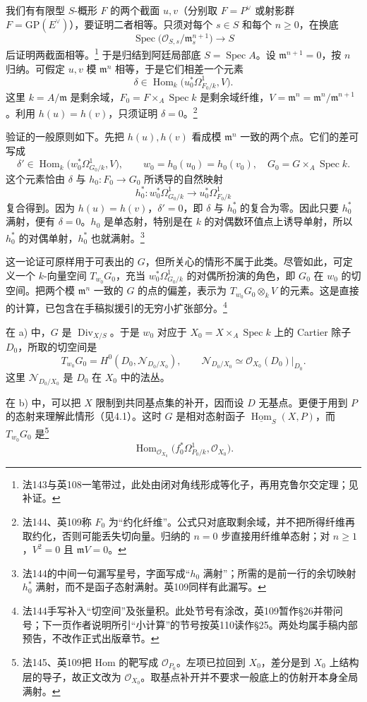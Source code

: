 \documentclass[openany,fontset=fandol]{ctexbook}
\DeclareMathOperator{\Spec}{Spec}
\DeclareMathOperator{\Div}{Div}
\newcommand{\OO}{\mathcal O}
\newcommand{\m}{\mathfrak m}
\newcommand{\Hom}{\operatorname{Hom}}
\begin{document}
我们有有限型 \(S\)-概形 \(F\) 的两个截面 \(u,v\)（分别取 \(F=P^\vee\) 或射影群 \(F=\mathrm{GP}(E^\vee)\)），要证明二者相等。只须对每个 \(s\in S\) 和每个 \(n\geq0\)，在换底
\[
 \Spec\bigl(\OO_{S,s}/\m_s^{n+1}\bigr)\longrightarrow S
\]
后证明两截面相等。\footnote{法143与英108一笔带过，此处由闭对角线形成等化子，再用克鲁尔交定理；见补证。}
于是归结到阿廷局部底 \(S=\Spec A\)。设 \(\m^{n+1}=0\)，按 \(n\) 归纳。可假定 \(u,v\) 模 \(\m^n\) 相等，于是它们相差一个元素
\[
 \delta\in\Hom_k\bigl(u_0^*\Omega^1_{F_0/k},V\bigr).
\]
这里 \(k=A/\m\) 是剩余域，\(F_0=F\times_A\Spec k\) 是剩余域纤维，\(V=\m^n=\m^n/\m^{n+1}\)。利用 \(h(u)=h(v)\)，只须证明 \(\delta=0\)。\footnote{法144、英109称 \(F_0\) 为“约化纤维”。公式只对底取剩余域，并不把所得纤维再取约化，否则可能丢失切向量。归纳的 \(n=0\) 步直接用纤维单态射；对 \(n\ge1\)，\(V^2=0\) 且 \(\m V=0\)。}

验证的一般原则如下。先把 \(h(u),h(v)\) 看成模 \(\m^n\) 一致的两个点。它们的差可写成
\[
 \delta'\in\Hom_k\bigl(w_0^*\Omega^1_{G_0/k},V\bigr),
 \qquad w_0=h_0(u_0)=h_0(v_0),\quad G_0=G\times_A\Spec k.
\]
这个元素恰由 \(\delta\) 与 \(h_0:F_0\to G_0\) 所诱导的自然映射
\[
 h_0^*:w_0^*\Omega^1_{G_0/k}\longrightarrow u_0^*\Omega^1_{F_0/k}
\]
复合得到。因为 \(h(u)=h(v)\)，\(\delta'=0\)，即 \(\delta\) 与 \(h_0^*\) 的复合为零。因此只要 \(h_0^*\) 满射，便有 \(\delta=0\)。\(h_0\) 是单态射，特别是在 \(k\) 的对偶数环值点上诱导单射，所以 \(h_0^*\) 的对偶单射，\(h_0^*\) 也就满射。\footnote{法144的中间一句漏写星号，字面写成“\(h_0\) 满射”；所需的是前一行的余切映射 \(h_0^*\) 满射，而不是函子态射满射。英109同样有此漏写。}

这一论证可原样用于可表出的 \(G\)，但所关心的情形不属于此类。尽管如此，可定义一个 \(k\)-向量空间 \(T_{w_0}G_0\)，充当 \(w_0^*\Omega^1_{G_0/k}\) 的对偶所扮演的角色，即 \(G_0\) 在 \(w_0\) 的切空间。把两个模 \(\m^n\) 一致的 \(G\) 的点的偏差，表示为 \(T_{w_0}G_0\otimes_kV\) 的元素。这是直接的计算，已包含在手稿拟援引的无穷小扩张部分。\footnote{法144手写补入“切空间”及张量积。此处节号有涂改，英109暂作§26并带问号；下一页作者说明所引“小计算”的节号按英110读作§25。两处均属手稿内部预告，不改作正式出版章节。}

在 a) 中，\(G\) 是 \(\Div_{X/S}\)。于是 \(w_0\) 对应于 \(X_0=X\times_A\Spec k\) 上的 Cartier 除子 \(D_0\)，所取的切空间是
\[
 T_{w_0}G_0=H^0(D_0,\mathcal N_{D_0/X_0}),
 \qquad
 \mathcal N_{D_0/X_0}\simeq\OO_{X_0}(D_0)|_{D_0}.
\]
这里 \(\mathcal N_{D_0/X_0}\) 是 \(D_0\) 在 \(X_0\) 中的法丛。

在 b) 中，可以把 \(X\) 限制到共同基点集的补开，因而设 \(D\) 无基点。更便于用到 \(P\) 的态射来理解此情形（见4.1）。这时 \(G\) 是相对态射函子 \(\underline{\Hom}_S(X,P)\)，而 \(T_{w_0}G_0\) 是\footnote{法145、英109把 Hom 的靶写成 \(\OO_{P_0}\)。左项已拉回到 \(X_0\)，差分是到 \(X_0\) 上结构层的导子，故正文改为 \(\OO_{X_0}\)。取基点补开并不要求一般底上的仿射开本身全局满射。}
\[
 \Hom_{\OO_{X_0}}\bigl(f_0^*\Omega^1_{P_0/k},\OO_{X_0}\bigr).
\]
\end{document}
